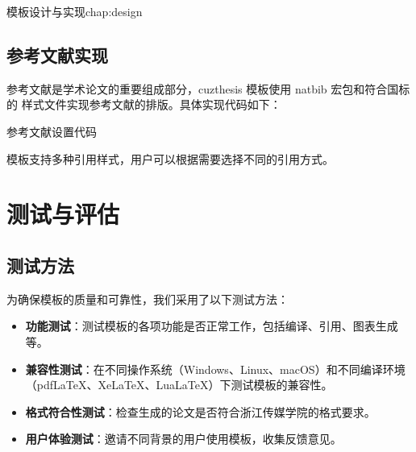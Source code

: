 \begin{cuzchapter}{模板设计与实现}{chap:design}
    \subsection{参考文献实现}

    参考文献是学术论文的重要组成部分，cuzthesis 模板使用 natbib 宏包和符合国标的  样式文件实现参考文献的排版。具体实现代码如下：

    \begin{listing}[htbp]
        \caption{参考文献设置代码}
        \label{code:bibliography}
        \begin{texcode}

            \setlength{\bibsep}{0.5ex}
            \renewcommand{\bibfont}{\small}
        \end{texcode}
    \end{listing}

    模板支持多种引用样式，用户可以根据需要选择不同的引用方式。

    \section{测试与评估}\label{sec:testing-evaluation}

    \subsection{测试方法}

    为确保模板的质量和可靠性，我们采用了以下测试方法：

    \begin{itemize}
        \item \textbf{功能测试}：测试模板的各项功能是否正常工作，包括编译、引用、图表生成等。

        \item \textbf{兼容性测试}：在不同操作系统（Windows、Linux、macOS）和不同编译环境（pdfLaTeX、XeLaTeX、LuaLaTeX）下测试模板的兼容性。

        \item \textbf{格式符合性测试}：检查生成的论文是否符合浙江传媒学院的格式要求。

        \item \textbf{用户体验测试}：邀请不同背景的用户使用模板，收集反馈意见。
    \end{itemize}


\end{cuzchapter}

